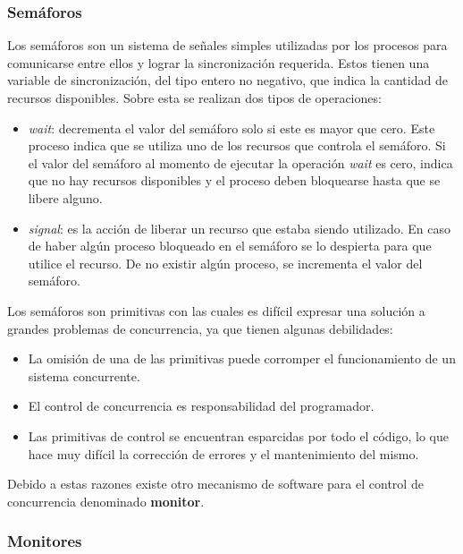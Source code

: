 \subsubsection{Semáforos}
Los semáforos son un sistema de señales simples utilizadas por los procesos para comunicarse entre ellos y lograr la sincronización requerida.
Estos tienen una variable de sincronización, del tipo entero no negativo, que indica la cantidad de recursos disponibles. Sobre esta se realizan dos tipos de operaciones:

\begin{itemize}
    \item \textit{wait}: decrementa el valor del semáforo solo si este es mayor que cero. Este proceso indica que se utiliza uno de los recursos que controla el semáforo. Si el valor del semáforo al momento de ejecutar la operación \textit{wait} es cero, indica que no hay recursos disponibles y el proceso deben bloquearse hasta que se libere alguno.
    \item \textit{signal}: es la acción de liberar un recurso que estaba siendo utilizado. En caso de haber algún proceso bloqueado en el semáforo se lo despierta para que utilice el recurso. De no existir algún proceso, se incrementa el valor del semáforo.
\end{itemize}

Los semáforos son primitivas con las cuales es difícil expresar una solución a grandes problemas de concurrencia, ya que tienen algunas debilidades:
\begin{itemize}
    \item La omisión de una de las primitivas puede corromper el funcionamiento de un sistema concurrente.
    \item El control de concurrencia es responsabilidad del programador.
    \item Las primitivas de control se encuentran esparcidas por todo el código, lo que hace muy difícil la corrección de errores y el mantenimiento del mismo.
\end{itemize}

Debido a estas razones existe otro mecanismo de software para el control de concurrencia denominado \textbf{monitor}.

\subsubsection{Monitores}


